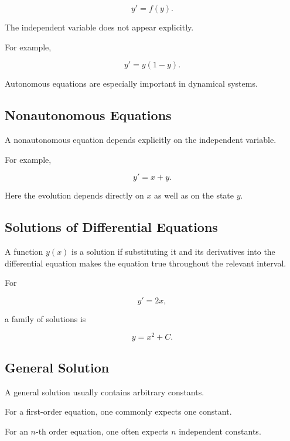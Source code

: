 \[
\boxed{
y'
=
f(y).
}
\]

The independent variable does not appear explicitly.

For example,

\[
\boxed{
y'
=
y(1-y).
}
\]

Autonomous equations are especially important in dynamical systems.

\subsection{Nonautonomous Equations}
\label{subsec:nonautonomous-odes}

A nonautonomous equation depends explicitly on the independent variable.

For example,

\[
\boxed{
y'
=
x+y.
}
\]

Here the evolution depends directly on \(x\) as well as on the state
\(y\).

\subsection{Solutions of Differential Equations}
\label{subsec:ode-solutions}

A function \(y(x)\) is a solution if substituting it and its derivatives
into the differential equation makes the equation true throughout the
relevant interval.

For

\[
y'=2x,
\]

a family of solutions is

\[
\boxed{
y=x^2+C.
}
\]

\subsection{General Solution}
\label{subsec:general-solution-ode}

A general solution usually contains arbitrary constants.

For a first-order equation, one commonly expects one constant.

For an \(n\)-th order equation, one often expects \(n\) independent
constants.

